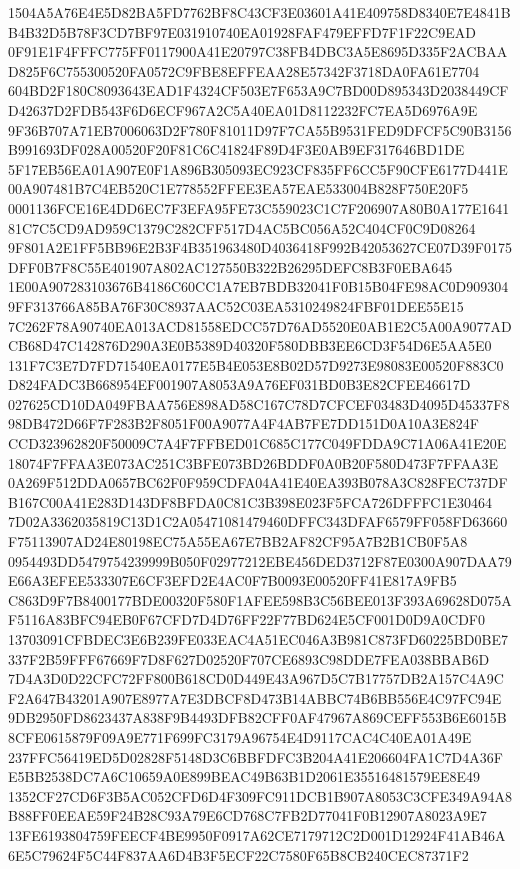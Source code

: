 \documentclass[UTF8,fontset=fandol,zihao=-4,a4paper]{ctexart}
\begin{document}
{{1504A5A76E4E5D82BA5FD7762BF8C43CF3E03601A41E409758D8340E7E4841BB4B32D5B78F3CD7BF97E031910740EA01928FAF479EFFD7F1F22C9EAD
0F91E1F4FFFC775FF0117900A41E20797C38FB4DBC3A5E8695D335F2ACBAAD825F6C755300520FA0572C9FBE8EFFEAA28E57342F3718DA0FA61E7704
604BD2F180C8093643EAD1F4324CF503E7F653A9C7BD00D895343D2038449CFD42637D2FDB543F6D6ECF967A2C5A40EA01D8112232FC7EA5D6976A9E
9F36B707A71EB7006063D2F780F81011D97F7CA55B9531FED9DFCF5C90B3156B991693DF028A00520F20F81C6C41824F89D4F3E0AB9EF317646BD1DE
5F17EB56EA01A907E0F1A896B305093EC923CF835FF6CC5F90CFE6177D441E00A907481B7C4EB520C1E778552FFEE3EA57EAE533004B828F750E20F5
0001136FCE16E4DD6EC7F3EFA95FE73C559023C1C7F206907A80B0A177E164181C7C5CD9AD959C1379C282CFF517D4AC5BC056A52C404CF0C9D08264
9F801A2E1FF5BB96E2B3F4B351963480D4036418F992B42053627CE07D39F0175DFF0B7F8C55E401907A802AC127550B322B26295DEFC8B3F0EBA645
1E00A907283103676B4186C60CC1A7EB7BDB32041F0B15B04FE98AC0D9093049FF313766A85BA76F30C8937AAC52C03EA5310249824FBF01DEE55E15
7C262F78A90740EA013ACD81558EDCC57D76AD5520E0AB1E2C5A00A9077ADCB68D47C142876D290A3E0B5389D40320F580DBB3EE6CD3F54D6E5AA5E0
131F7C3E7D7FD71540EA0177E5B4E053E8B02D57D9273E98083E00520F883C0D824FADC3B668954EF001907A8053A9A76EF031BD0B3E82CFEE46617D
027625CD10DA049FBAA756E898AD58C167C78D7CFCEF03483D4095D45337F898DB472D66F7F283B2F8051F00A9077A4F4AB7FE7DD151D0A10A3E824F
CCD323962820F50009C7A4F7FFBED01C685C177C049FDDA9C71A06A41E20E18074F7FFAA3E073AC251C3BFE073BD26BDDF0A0B20F580D473F7FFAA3E
0A269F512DDA0657BC62F0F959CDFA04A41E40EA393B078A3C828FEC737DFB167C00A41E283D143DF8BFDA0C81C3B398E023F5FCA726DFFFC1E30464
7D02A3362035819C13D1C2A05471081479460DFFC343DFAF6579FF058FD63660F75113907AD24E80198EC75A55EA67E7BB2AF82CF95A7B2B1CB0F5A8
0954493DD5479754239999B050F02977212EBE456DED3712F87E0300A907DAA79E66A3EFEE533307E6CF3EFD2E4AC0F7B0093E00520FF41E817A9FB5
C863D9F7B8400177BDE00320F580F1AFEE598B3C56BEE013F393A69628D075AF5116A83BFC94EB0F67CFD7D4D76FF22F77BD624E5CF001D0D9A0CDF0
13703091CFBDEC3E6B239FE033EAC4A51EC046A3B981C873FD60225BD0BE7337F2B59FFF67669F7D8F627D02520F707CE6893C98DDE7FEA038BBAB6D
7D4A3D0D22CFC72FF800B618CD0D449E43A967D5C7B17757DB2A157C4A9CF2A647B43201A907E8977A7E3DBCF8D473B14ABBC74B6BB556E4C97FC94E
9DB2950FD8623437A838F9B4493DFB82CFF0AF47967A869CEFF553B6E6015B8CFE0615879F09A9E771F699FC3179A96754E4D9117CAC4C40EA01A49E
237FFC56419ED5D02828F5148D3C6BBFDFC3B204A41E206604FA1C7D4A36FE5BB2538DC7A6C10659A0E899BEAC49B63B1D2061E35516481579EE8E49
1352CF27CD6F3B5AC052CFD6D4F309FC911DCB1B907A8053C3CFE349A94A8B88FF0EEAE59F24B28C93A79E6CD768C7FB2D77041F0B12907A8023A9E7
13FE6193804759FEECF4BE9950F0917A62CE7179712C2D001D12924F41AB46A6E5C79624F5C44F837AA6D4B3F5ECF22C7580F65B8CB240CEC87371F2
}}
\end{document}
